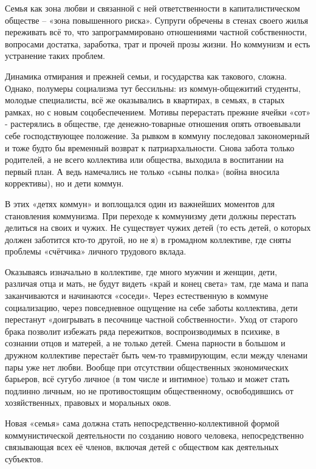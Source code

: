 \documentclass[../main]{subfiles}
\begin{document}
Семья как зона любви и связанной с ней ответственности в капиталистическом обществе – «зона повышенного риска». Супруги обречены в стенах своего жилья переживать всё то, что запрограммировано отношениями частной собственности, вопросами достатка, заработка, трат и прочей прозы жизни. Но коммунизм и есть устранение таких проблем.

Динамика отмирания и прежней семьи, и государства как такового, сложна. Однако, полумеры социализма тут бессильны: из коммун-общежитий студенты, молодые специалисты, всё же оказывались в квартирах, в семьях, в старых рамках, но с новым соцобеспечением. Мотивы перерастать прежние ячейки «сот» - растерялись в обществе, где денежно-товарные отношения опять отвоевывали себе господствующее положение. За рывком в коммуну последовал закономерный и тоже будто бы временный возврат к патриархальности. Снова забота только родителей, а не всего коллектива или общества, выходила в воспитании на первый план. А ведь намечались не только «сыны полка» (война вносила коррективы), но и дети коммун.

В этих «детях коммун» и воплощался один из важнейших моментов для становления коммунизма. При переходе к коммунизму дети должны перестать делиться на своих и чужих. Не существует чужих детей (то есть детей, о которых должен заботится кто-то другой, но не я) в громадном коллективе, где сняты проблемы «счётчика» личного трудового вклада.

Оказываясь изначально в коллективе, где много мужчин и женщин, дети, различая отца и мать, не будут видеть «край и конец света» там, где мама и папа заканчиваются и начинаются «соседи». Через естественную в коммуне социализацию, через повседневное ощущение на себе заботы коллектива, дети перестанут «доигрывать в песочнице частной собственности». Уход от старого брака позволит избежать ряда пережитков, воспроизводимых в психике, в сознании отцов и матерей, а не только детей. Смена парности в большом и дружном коллективе перестаёт быть чем-то травмирующим, если между членами пары уже нет любви. Вообще при отсутствии общественных экономических барьеров, всё сугубо личное (в том числе и интимное) только и может стать подлинно личным, но не противостоящим общественному, освободившись от хозяйственных, правовых и моральных оков.

Новая «семья» сама должна стать непосредственно-коллективной формой коммунистической деятельности по созданию нового человека, непосредственно связывающая всех её членов, включая детей с обществом как деятельных субъектов.
\end{document}
